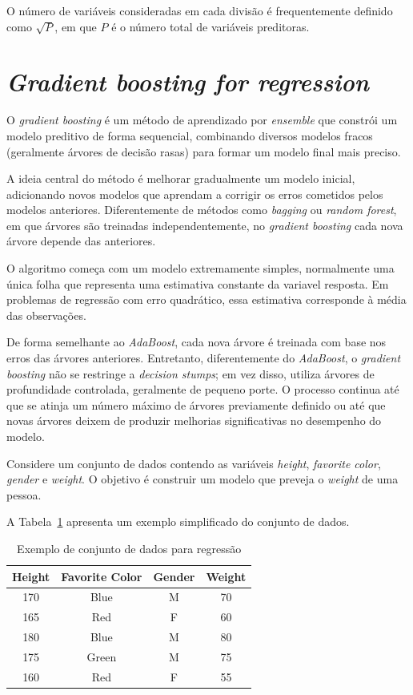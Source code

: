 \documentclass{article}
\begin{document}
O número de variáveis consideradas em cada divisão
é frequentemente definido como $\sqrt{P}$, em que $P$ é o número total de
variáveis preditoras.

\section{\textit{Gradient boosting for regression}}

O \textit{gradient boosting} é um método de aprendizado por 
\textit{ensemble} que constrói um modelo preditivo de forma 
sequencial, combinando diversos modelos fracos (geralmente 
árvores de decisão rasas) para formar um modelo final mais 
preciso.

A ideia central do método é melhorar gradualmente um modelo 
inicial, adicionando novos modelos que aprendam a corrigir 
os erros cometidos pelos modelos anteriores. Diferentemente 
de métodos como \textit{bagging} ou \textit{random forest}, 
em que árvores são treinadas independentemente, no 
\textit{gradient boosting} cada nova árvore depende das 
anteriores.

O algoritmo começa com um modelo extremamente simples, 
normalmente uma única folha que representa uma estimativa 
constante da variavel resposta. Em problemas de regressão 
com erro quadrático, essa estimativa corresponde à média 
das observações.

De forma semelhante ao \textit{AdaBoost}, cada nova árvore 
é treinada com base nos erros das árvores anteriores. 
Entretanto, diferentemente do \textit{AdaBoost}, o \textit{gradient boosting} 
não se restringe a \textit{decision stumps}; em vez disso, 
utiliza árvores de profundidade controlada, geralmente de 
pequeno porte. O processo continua até que se atinja um número 
máximo de árvores previamente definido ou até que novas árvores 
deixem de produzir melhorias significativas no desempenho 
do modelo.

Considere um conjunto de dados contendo as variáveis 
\textit{height}, \textit{favorite color}, \textit{gender} e
\textit{weight}. O objetivo é construir um modelo que preveja 
o \textit{weight} de uma pessoa.

A Tabela~\ref{tab:gb_data} apresenta um exemplo simplificado 
do conjunto de dados.

\begin{table}[h]
\centering
\begin{tabular}{cccc}
\hline
Height & Favorite Color & Gender & Weight \\
\hline
170 & Blue & M & 70 \\
165 & Red & F & 60 \\
180 & Blue & M & 80 \\
175 & Green & M & 75 \\
160 & Red & F & 55 \\
\hline
\end{tabular}
\caption{Exemplo de conjunto de dados para regressão}
\label{tab:gb_data}
\end{table}
\end{document}
